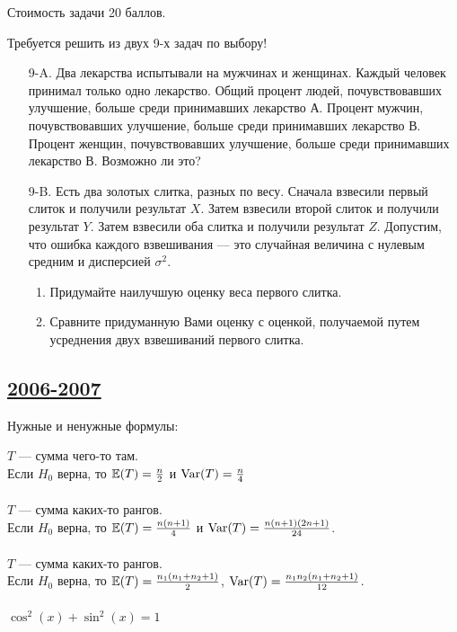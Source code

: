 Стоимость задачи 20 баллов.

Требуется решить \textbf{} из двух 9-х задач по
выбору!

\begin{enumerate}
\item[9-A.] Два лекарства испытывали на мужчинах и женщинах. Каждый
человек принимал только одно лекарство. Общий процент людей,
почувствовавших улучшение, больше среди принимавших лекарство А.
Процент мужчин, почувствовавших улучшение, больше среди принимавших лекарство В. Процент женщин, почувствовавших улучшение, больше среди принимавших лекарство В. Возможно ли это?

\item[9-B.] Есть два золотых слитка, разных по весу. Сначала взвесили первый слиток и получили результат $X$. Затем взвесили второй слиток и получили результат $Y$. Затем взвесили оба слитка и получили результат $Z$. Допустим, что ошибка каждого взвешивания — это случайная величина с нулевым средним и дисперсией $\sigma^{2}$.
\begin{enumerate}
\item Придумайте наилучшую оценку веса первого слитка.
\item Сравните придуманную Вами оценку с оценкой, получаемой путем усреднения двух взвешиваний первого слитка.
\end{enumerate}
\end{enumerate}


\subsection[2006-2007]{\hyperref[sec:sol_kr_03_2006_2007]{2006-2007}}
\label{sec:kr_03_2006_2007}

Нужные и ненужные формулы:


$T$ — сумма чего-то там. \\
Если $H_{0}$ верна, то $\operatorname{\mathbb{E}}(T)=\frac{n}{2}$ и $\operatorname{Var}(T)=\frac{n}{4}$ \\ \\
$T$ — сумма каких-то рангов. \\
Если $H_{0}$ верна, то $\operatorname{\mathbb{E}}(T)=\frac{n(n+1)}{4}$ и
$\operatorname{Var}(T)=\frac{n(n+1)(2n+1)}{24}$. \\ \\
$T$ — сумма каких-то рангов. \\
Если $H_{0}$ верна, то $\operatorname{\mathbb{E}}(T)=\frac{n_{1}(n_{1}+n_{2}+1)}{2}$,
$\operatorname{Var}(T)=\frac{n_{1}n_{2}(n_{1}+n_{2}+1)}{12}$. \\ \\
$\cos^{2}(x)+\sin^{2}(x)=1$ \\

